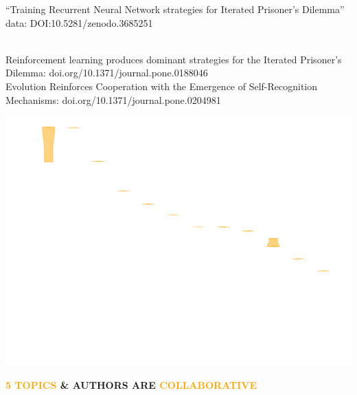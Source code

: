 \documentclass{beamer}
\begin{document}
\begin{frame}
    \begin{center}
        \large{``Training Recurrent Neural Network strategies for Iterated Prisoner's Dilemma''} \\ \vspace{.5cm}
        \footnotesize{data: DOI:10.5281/zenodo.3685251}
    \end{center}
\end{frame}
\begin{frame}
    \begin{center}
     \\ \vspace{.5cm}
    \pause
    \small{Reinforcement learning produces dominant strategies for the Iterated Prisoner's Dilemma: doi.org/10.1371/journal.pone.0188046} \\ \vspace{.5cm}
    \pause
    \small{Evolution Reinforces Cooperation with the Emergence of Self-Recognition Mechanisms: doi.org/10.1371/journal.pone.0204981}
    \end{center}
\end{frame}

\begin{frame}
    \begin{center}
    
    \end{center}
\end{frame}
\begin{frame}
    \begin{center}
        \includegraphics[width=\textwidth]{static/lstm_performance.png}
    \end{center}
\end{frame}
\begin{frame}
    \begin{center}
    \Large{\textbf{\textcolor{orange}{5 TOPICS} \& AUTHORS ARE  \textcolor{orange}{COLLABORATIVE}}}
    \end{center}
\end{frame}
\end{document}
